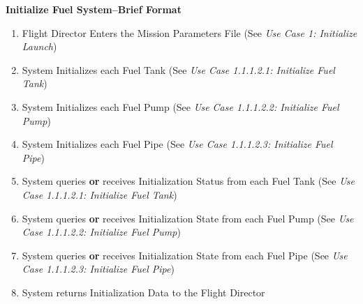 \documentclass[letterpaper]{article}
\begin{document}
\noindent
\textbf{Initialize Fuel System--Brief Format}
\begin{enumerate}
   \item Flight Director Enters the Mission Parameters File (See 
      \textit{Use Case 1: Initialize Launch})
   \item System Initializes each Fuel Tank (See 
      \textit{Use Case 1.1.1.2.1:  Initialize Fuel Tank})
   \item System Initializes each Fuel Pump (See 
      \textit{Use Case 1.1.1.2.2:  Initialize Fuel Pump})
   \item System Initializes each Fuel Pipe (See 
      \textit{Use Case 1.1.1.2.3:  Initialize Fuel Pipe})
   \item System queries \textbf{or} receives Initialization Status
      from each Fuel Tank (See 
      \textit{Use Case 1.1.1.2.1:  Initialize Fuel Tank})
   \item System queries \textbf{or} receives Initialization State from
      each Fuel Pump (See 
      \textit{Use Case 1.1.1.2.2:  Initialize Fuel Pump}) 
   \item System queries \textbf{or} receives Initialization State from
      each Fuel Pipe (See 
      \textit{Use Case 1.1.1.2.3:  Initialize Fuel Pipe})
   \item System returns Initialization Data to the Flight Director
\end{enumerate}
\end{document}
